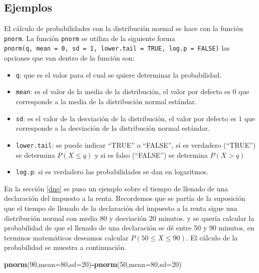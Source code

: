 \documentclass[letterpaper,]{book}
\newenvironment{Shaded}{\begin{snugshade}}{\end{snugshade}}
\newcommand{\DataTypeTok}[1]{\textcolor[rgb]{0.13,0.29,0.53}{#1}}
\newcommand{\DecValTok}[1]{\textcolor[rgb]{0.00,0.00,0.81}{#1}}
\newcommand{\KeywordTok}[1]{\textcolor[rgb]{0.13,0.29,0.53}{\textbf{#1}}}
\newcommand{\NormalTok}[1]{#1}
\newcommand{\OperatorTok}[1]{\textcolor[rgb]{0.81,0.36,0.00}{\textbf{#1}}}
\providecommand{\tightlist}{%
  \setlength{\itemsep}{0pt}\setlength{\parskip}{0pt}}
\begin{document}
\hypertarget{ejemplos}{%
\subsection{Ejemplos}\label{ejemplos}}

El cálculo de probabilidades con la distribución normal se hace con la función \texttt{pnorm}. La función \texttt{pnorm} se utiliza de la siguiente forma \texttt{pnorm(q,\ mean\ =\ 0,\ sd\ =\ 1,\ lower.tail\ =\ TRUE,\ log.p\ =\ FALSE)} las opciones que van dentro de la función son:

\begin{itemize}
\tightlist
\item
  \texttt{q}: que es el valor para el cual se quiere determinar la probabilidad.
\item
  \texttt{mean}: es el valor de la media de la distribución, el valor por defecto es \(0\) que corresponde a la media de la distribución normal estándar.
\item
  \texttt{sd}: es el valor de la desviación de la distribución, el valor por defecto es \(1\) que corresponde a la desviación de la distribución normal estándar.
\item
  \texttt{lower.tail}: se puede indicar ``TRUE'' o ``FALSE'', si es verdadero (``TRUE'') se determina \(P\left(X \leq q \right)\) y si es falso (``FALSE'') se determina \(P\left( X > q \right)\)
\item
  \texttt{log.p}: si es verdadero las probabilidades se dan en logaritmos.
\end{itemize}

En la sección \ref{dne} se puso un ejemplo sobre el tiempo de llenado de una declaración del impuesto a la renta. Recordemos que se partía de la suposición que el tiempo de llenado de la declaración del impuesto a la renta sigue una distribución normal con media \(80\) y desviación \(20\) minutos. y se quería calcular la probabilidad de que el llenado de una declaración se dé entre 50 y 90 minutos, en terminos matemáticos deseamos calcular \(P\left( 50 \leq X \leq 90 \right)\). El cálculo de la probabilidad se muestra a continuación.

\begin{Shaded}
\begin{Highlighting}[]
\KeywordTok{pnorm}\NormalTok{(}\DecValTok{90}\NormalTok{,}\DataTypeTok{mean=}\DecValTok{80}\NormalTok{,}\DataTypeTok{sd=}\DecValTok{20}\NormalTok{)}\OperatorTok{-}\KeywordTok{pnorm}\NormalTok{(}\DecValTok{50}\NormalTok{,}\DataTypeTok{mean=}\DecValTok{80}\NormalTok{,}\DataTypeTok{sd=}\DecValTok{20}\NormalTok{)}
\end{Highlighting}
\end{Shaded}
\end{document}
